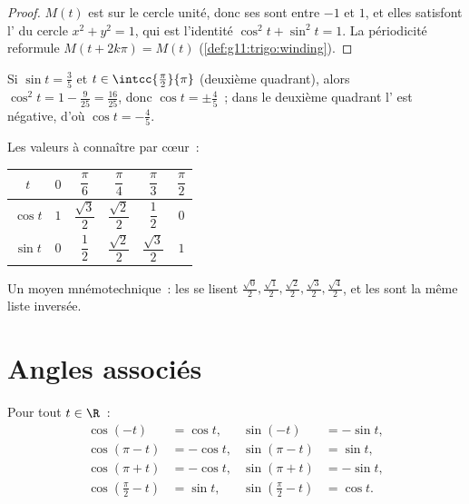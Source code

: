 \begin{proof}
$M(t)$ est sur le cercle unité, donc ses  sont entre $-1$ et
$1$, et elles satisfont l' du cercle $x^2 + y^2 = 1$, qui est
l'identité $\cos^2 t + \sin^2 t = 1$. La périodicité reformule
$M(t + 2k\pi) = M(t)$ (\cref{def:g11:trigo:winding}).
\end{proof}

\begin{example}\label{ex:g11:trigo:identity}
Si $\sin t = \frac35$ et $t \in \intcc{\frac\pi2}{\pi}$ (deuxième
quadrant), alors $\cos^2 t = 1 - \frac{9}{25} = \frac{16}{25}$, donc
$\cos t = \pm\frac45$~; dans le deuxième quadrant l' est
négative, d'où $\cos t = -\frac45$.
\end{example}

Les valeurs à connaître par cœur~:
\begin{center}
\begin{tabular}{c|ccccc}
$t$ & $0$ & $\dfrac{\pi}{6}$ & $\dfrac{\pi}{4}$ & $\dfrac{\pi}{3}$ & $\dfrac{\pi}{2}$\\[6pt]
\hline\rule{0pt}{14pt}%
$\cos t$ & $1$ & $\dfrac{\sqrt3}{2}$ & $\dfrac{\sqrt2}{2}$ & $\dfrac12$ & $0$\\[6pt]
$\sin t$ & $0$ & $\dfrac12$ & $\dfrac{\sqrt2}{2}$ & $\dfrac{\sqrt3}{2}$ & $1$
\end{tabular}
\end{center}

\begin{remark}
Un moyen mnémotechnique~: les  se lisent
$\frac{\sqrt0}{2}, \frac{\sqrt1}{2}, \frac{\sqrt2}{2}, \frac{\sqrt3}{2},
\frac{\sqrt4}{2}$, et les  sont la même liste inversée.
\end{remark}

\section{Angles associés}

\begin{proposition}\label{prop:g11:trigo:associated}
Pour tout $t \in \R$~:
\[
\begin{aligned}
\cos(-t) &= \cos t, & \sin(-t) &= -\sin t,\\
\cos(\pi - t) &= -\cos t, & \sin(\pi - t) &= \sin t,\\
\cos(\pi + t) &= -\cos t, & \sin(\pi + t) &= -\sin t,\\
\cos\left(\tfrac{\pi}{2} - t\right) &= \sin t, &
\sin\left(\tfrac{\pi}{2} - t\right) &= \cos t .
\end{aligned}
\]
\end{proposition}

